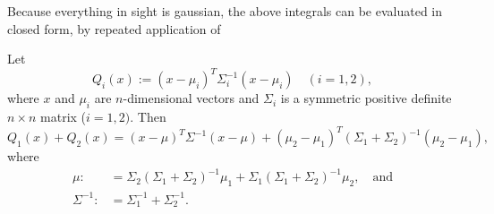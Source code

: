 \documentclass[12pt,leqno]{article}
\begin{document}
Because everything in sight is gaussian, the above integrals can be evaluated in closed form, by repeated application of
\begin{Lem}\label{comp_sq:1}
  Let
  $$
  Q_i(x) := (x-\mu_i)^T\Sigma_i^{-1}(x-\mu_i)\quad(i = 1,2),
  $$
  where $x$ and $\mu_i$ are $n$-dimensional vectors and $\Sigma_i$ is a symmetric positive definite $n\times{n}$
  matrix ($i = 1,2)$. Then
  $$
  Q_1(x) + Q_2(x) = (x-\mu)^T\Sigma^{-1}(x-\mu) + (\mu_2-\mu_1)^T(\Sigma_1+\Sigma_2)^{-1}(\mu_2-\mu_1),
  $$
  where
  \begin{align*}
    \mu :&= \Sigma_2(\Sigma_1+\Sigma_2)^{-1}\mu_1+\Sigma_1(\Sigma_1+\Sigma_2)^{-1}\mu_2,\quad\text{and}\\
    \Sigma^{-1} :&= \Sigma_1^{-1} + \Sigma_2^{-1}.
  \end{align*}
\end{Lem}
\end{document}
